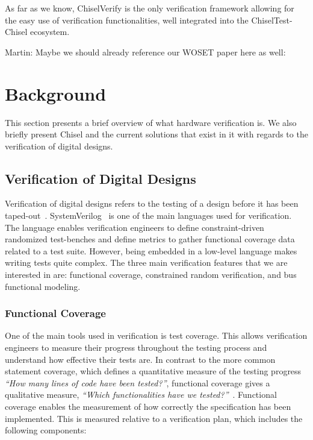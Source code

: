 \documentclass[conference]{IEEEtran}
\newcommand{\martin}[1]{{\color{blue} Martin: #1}}
\begin{document}
As far as we know, ChiselVerify is the only verification framework allowing for the easy use of verification functionalities, well integrated into the ChiselTest-Chisel ecosystem.

\martin{Maybe we should already reference our WOSET paper here as well: \cite{verify:fuzzing:2021}}

\section{Background}
\label{sec:background}

This section presents a brief overview of what hardware verification is. 
We also briefly present Chisel and the current solutions that exist in it with regards to the verification of digital designs.

\subsection{Verification of Digital Designs}
Verification of digital designs refers to the testing of a design before it has been taped-out~\cite{spear2008systemverilog}. 
SystemVerilog~\cite{SystemVerilog} is one of the main languages used for verification.
The language enables verification engineers to define constraint-driven randomized test-benches and define metrics to gather functional coverage data related to a test suite. 
However, being embedded in a low-level language makes writing tests quite complex. 
The three main verification features that we are interested in are: functional coverage, constrained random verification, and bus functional modeling.

\subsubsection{Functional Coverage}
One of the main tools used in verification is test coverage. 
This allows verification engineers to measure their progress throughout the testing process and understand how effective their tests are. 
In contrast to the more common statement coverage, which defines a quantitative measure of the testing progress \textit{``How many lines of code have been tested?''}, functional coverage gives a qualitative measure, \textit{``Which functionalities have we tested?''}~\cite{spear2008systemverilog}.
Functional coverage enables the measurement of how correctly the specification has been implemented. 
This is measured relative to a verification plan, which includes the following components:
\end{document}
